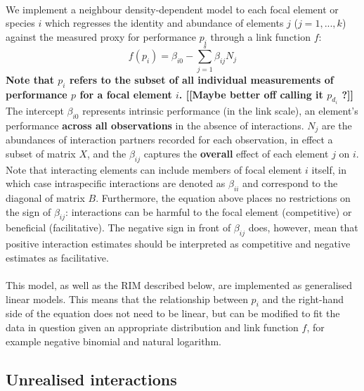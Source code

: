\documentclass[a4,12pt]{article}
\begin{document}
        \paragraph{}
        We implement a neighbour density-dependent model to each focal element or species $i$ which regresses the identity and abundance of elements $j$ ($j = 1, ..., k$) against the measured proxy for performance $p_{i}$ through a link function $f$:
        \begin{equation}
        f(p_{i}) = \beta_{i0} - \sum_{j=1}^{s} \beta_{ij} N_{j}
        \label{nddm}
        \end{equation}
        \textbf{Note that $p_i$ refers to the subset of all individual measurements of performance $p$ for a focal element $i$. [[Maybe better off calling it $p_{d_i}$ ?]]}
        The intercept $\beta_{i0}$ represents intrinsic performance (in the link scale), an element's performance \textbf{across all observations} in the absence of interactions. $N_{j}$ are the abundances of interaction partners recorded for each observation, in effect a subset of matrix $X$, and the $\beta_{ij}$ captures the \textbf{overall} effect of each element $j$ on $i$. Note that interacting elements can include members of focal element $i$ itself, in which case intraspecific interactions are denoted as $\beta_{ii}$ and correspond to the diagonal of matrix $B$. Furthermore, the equation above places no restrictions on the sign of $\beta_{ij}$: interactions can be harmful to the focal element (competitive) or beneficial (facilitative). The negative sign in front of $\beta_{ij}$ does, however, mean that positive interaction estimates should be interpreted as competitive and negative estimates as facilitative. 

        \paragraph{}
        This model, as well as the RIM described below, are implemented as generalised linear models. This means that the relationship between $p_i$ and the right-hand side of the equation does not need to be linear, but can be modified to fit the data in question given an appropriate distribution and link function $f$, for example negative binomial and natural logarithm. 
              
    \subsection{Unrealised interactions}
    \label{meth:rim}
\end{document}
